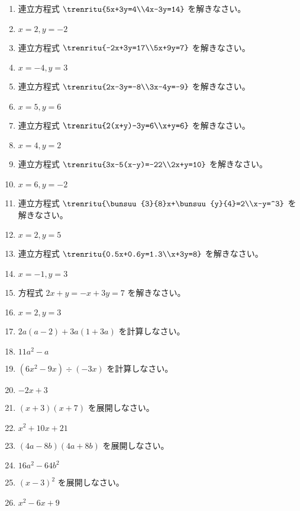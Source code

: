 \documentclass[uplatex,a4j,11pt]{jsreport}
\begin{document}
\begin{multicols}{2}
\begin{enumerate}
    \item 連立方程式 $\trenritu{5x+3y=4\\4x-3y=14}$ を解きなさい。%
    \item $x=2, y=-2$
    \item 連立方程式 $\trenritu{-2x+3y=17\\5x+9y=7}$ を解きなさい。%
    \item $x=-4, y=3$
    \item 連立方程式 $\trenritu{2x-3y=-8\\3x-4y=-9}$ を解きなさい。%
    \item $x=5, y=6$
    \item 連立方程式 $\trenritu{2(x+y)-3y=6\\x+y=6}$ を解きなさい。%
    \item $x=4, y=2$
    \item 連立方程式 $\trenritu{3x-5(x-y)=-22\\2x+y=10}$ を解きなさい。%
    \item $x=6, y=-2$
    \item 連立方程式 $\trenritu{\bunsuu{3}{8}x+\bunsuu{y}{4}=2\\x-y=^3}$ を解きなさい。%
    \item $x=2, y=5$
    \item 連立方程式 $\trenritu{0.5x+0.6y=1.3\\x+3y=8}$ を解きなさい。%
    \item $x=-1, y=3$
    \item 方程式 $2x+y = -x+3y = 7$ を解きなさい。%
    \item $x=2, y=3$
    \item $2a(a-2)+3a(1+3a)$ を計算しなさい。%
    \item $11a^2-a$
    \item $(6x^2-9x)\div(-3x)$ を計算しなさい。%
    \item $-2x+3$
    \item $(x+3)(x+7)$ を展開しなさい。%
    \item $x^2+10x+21$
    \item $(4a-8b)(4a+8b)$ を展開しなさい。%
    \item $16a^2-64b^2$
    \item $(x-3)^2$ を展開しなさい。%
    \item $x^2-6x+9$

\end{enumerate}
\end{multicols}
\end{document}
